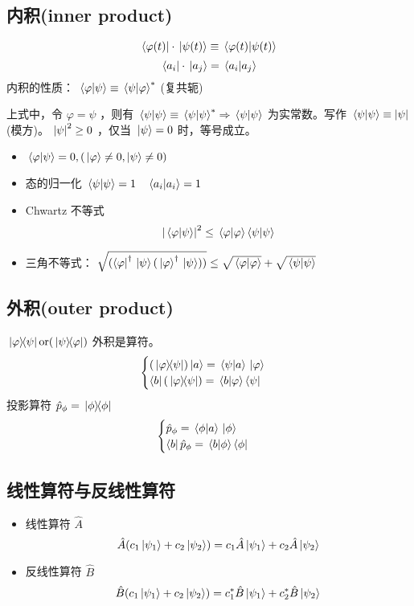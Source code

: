 \subsection{内积(inner product)}
\[
    \bra{\varphi(t)}\cdot\ket*{\psi(t)}\equiv\braket*{\varphi(t)}{\psi(t)}
\]
\[
    \bra{a_i}\cdot\ket*{a_j}=\braket*{a_i}{a_j}
\]
内积的性质： \( \braket*{\varphi}{\psi}\equiv\braket*{\psi }{\varphi}^* \) (复共轭)

上式中，令 \( \varphi=\psi  \) ，则有 \( \braket*{\psi }{\psi}\equiv\braket*{\psi }{\psi }^*\Rightarrow\braket*{\psi }{\psi } \) 为实常数。写作 \( \braket*{\psi }{\psi }\equiv\qty|\psi| \) (模方)。 \( \qty|\psi|^2\ge 0 \) ，仅当 \( \ket*{\psi }=0 \) 时，等号成立。

\begin{itemize}
    \item  \( \braket*{\varphi}{\psi }=0,(\ket*{\varphi}\ne 0,\ket{\psi }\ne 0) \)
    \item 态的归一化 \( \braket*{\psi}{\psi }=1 \quad\braket*{a_i}{a_i}=1\) 
    \item Chwartz 不等式 \[
        \qty|\braket*{\varphi}{\psi }|^2\le\braket*{\varphi}{\varphi}\braket{\psi }\]
        \item 三角不等式：  \( \sqrt{(\bra{\varphi }^\dagger\ket*{\psi}(\ket*{\varphi}^\dagger\ket*{\psi }))}\le\sqrt{\braket*{\varphi}{\varphi}}+\sqrt{\braket*{\psi }{\psi }} \) 
\end{itemize}

\subsection{外积(outer product)}
 \( \ketbra*{\varphi}{\psi }\text{or}(\ketbra*{\psi }{\varphi}) \) 外积是算符。
 \[
    \begin{cases}
     (\ketbra*{\varphi}{\psi })\ket*{a}=\braket*{\psi }{a}\ket*{\varphi}\\ 
     \bra{b}(\ketbra*{\varphi}{\psi })=\braket*{b}{\varphi}\bra{\psi }
    \end{cases}
 \]
投影算符  \( \hat{p }_\phi=\ketbra*{\phi }{\phi } \) 
\[
\begin{cases}
    \hat{p}_\phi=\braket*{\phi }{a}\ket*{\phi }\\ 
    \bra{b}\hat{p }_\phi=\braket*{b}{\phi }\bra{\phi }
\end{cases}    
\]

\subsection{线性算符与反线性算符}
\begin{itemize}
    \item 线性算符 \( \hat{A} \) \[\hat{A}\qty(c_1\ket*{\psi_1}+c_2\ket*{\psi_2})=c_1\hat{A}\ket*{\psi_1}+c_2\hat{A}\ket*{\psi_2}\]
    \item 反线性算符 \( \hat{B} \) \[\hat{B}\qty(c_1\ket*{\psi_1}+c_2\ket*{\psi_2})=c_1^*\hat{B}\ket*{\psi_1}+c_2^*\hat{B}\ket*{\psi_2}
        \]
\end{itemize}

